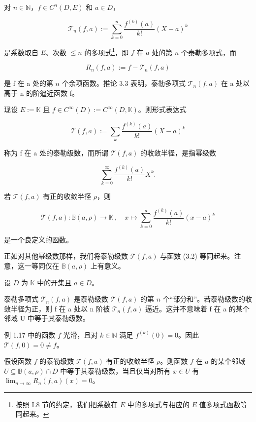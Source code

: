 对 $ n \in \mathbb{N} $，$ f \in C^n(D, E) $ 和 $ a \in D $，

\[
\mathcal{T}_{n}(f,a):=\sum_{k=0}^{n}\frac{f^{(k)}(a)}{k!}(X-a)^{k}
\]

是系数取自 $ E $、次数 $ \leq n $ 的多项式\footnote{按照 I.8 节的约定，我们把系数在 $ E $ 中的多项式与相应的 $ E $ 值多项式函数等同起来。}，即 $ f $ 在 $ a $ 处的第 $ n $ 个泰勒多项式，而

\[
R_{n}(f,a):=f-\mathcal{T}_{n}(f,a)
\]

是 f 在 a 处的第 $ n $ 个余项函数。推论 3.3 表明，泰勒多项式 $ \mathcal{T}_{n}(f, a) $ 在 a 处以高于 n 的阶逼近函数 f。

现设 $ E := \mathbb{K} $ 且 $ f \in C^\infty(D) := C^\infty(D, \mathbb{K}) $。则形式表达式

\[
\mathcal{T}(f,a):=\sum_{k}\frac{f^{(k)}(a)}{k!}(X-a)^{k}
\]

称为 f 在 a 处的泰勒级数，而所谓 $ \mathcal{T}(f,a) $ 的收敛半径，是指幂级数

\[
\sum_{k=0}^{\infty}\frac{f^{(k)}(a)}{k!}X^{k}.
\]

若 $ \mathcal{T}(f,a) $ 有正的收敛半径 $ \rho $，则

\[
\mathcal{T}(f,a)\colon\mathbb{B}(a,\rho)\to\mathbb{K}~,\quad x\mapsto\sum_{k=0}^{\infty}\frac{f^{(k)}(a)}{k!}(x-a)^{k}
\]

是一个良定义的函数。

正如对其他幂级数那样，我们将泰勒级数 $ \mathcal{T}(f, a) $ 与函数 (3.2) 等同起来。注意，这一等同仅在 $ \mathbb{B}(a, \rho) $ 上有意义。

\begin{remark}

设 $D$ 为 $\mathbb{K}$ 中的开集且 $a \in D$。

\begin{items}
\item

泰勒多项式 $ \mathcal{T}_n(f, a) $ 是泰勒级数 $ \mathcal{T}(f, a) $ 的第 $ n $ 个“部分和”。若泰勒级数的收敛半径为正，则 f 在 a 处以 n 阶被 $ \mathcal{T}_n(f, a) $ 逼近。这并不意味着 f 在 a 的某个邻域 U 中等于其泰勒级数。

\proofhead
例 1.17 中的函数 $f$ 光滑，且对 $k \in \mathbb{N}$ 满足 $f^{(k)}(0) = 0$。因此 $\mathcal{T}(f,0) = 0 \neq f$。
\item

假设函数 $f$ 的泰勒级数 $\mathcal{T}(f,a)$ 有正的收敛半径 $\rho$。则函数 $f$ 在 $a$ 的某个邻域 $U \subseteq \mathbb{B}(a,\rho) \cap D$ 中等于其泰勒级数，当且仅当对所有 $x \in U$ 有 $\lim_{n \to \infty} R_n(f,a)(x) = 0$。

\end{items}

\end{remark}


